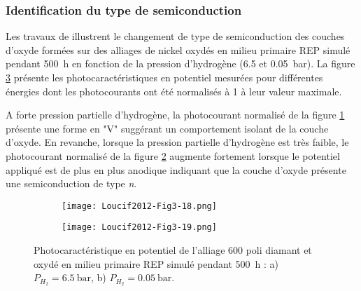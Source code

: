 \begin{refsection}
    \subsubsection{Identification du type de semiconduction}

    Les travaux de \citet{Loucif2013} illustrent le changement de type de semiconduction des couches d'oxyde formées 
    sur des alliages de nickel oxydés en
    milieu primaire REP simulé pendant 500~h en fonction de la pression d'hydrogène (6.5 et \SI{0.05}{\bar}).
    La figure \ref{fig:loucif_application} présente les photocaractéristiques en potentiel mesurées pour différentes
    énergies dont les photocourants ont été normalisés à 1 à leur valeur maximale.
    
    A forte pression partielle d'hydrogène, la photocourant normalisé de la figure
    \ref{subfig:loucif_fig3_18} présente une forme en "V" suggérant un comportement isolant de la couche d'oxyde.
    En revanche, lorsque la pression partielle d'hydrogène est très faible, le photocourant normalisé de la figure \ref{subfig:loucif_fig3_19}
    augmente fortement lorsque le potentiel appliqué est de plus en plus anodique
    indiquant que la couche d'oxyde présente une semiconduction de type \emph{n}.
    
     \begin{figure}[H]
        \centering
        \begin{subfigure}[b]{0.48\textwidth}
            \texttt{[image: Loucif2012-Fig3-18.png]}
            \caption{}
            \label{subfig:loucif_fig3_18}
        \end{subfigure}
        \begin{subfigure}[b]{0.48\textwidth}
            \texttt{[image: Loucif2012-Fig3-19.png]}
            \caption{}
            \label{subfig:loucif_fig3_19}
        \end{subfigure}
        \caption[Photocaractéristique en potentiel de l'alliage 600 poli diamant et oxydé en milieu primaire REP simulé pendant
        500~h:
        a) $P_{H_2} = \SI{6.5}{\bar}$,
        b) $P_{H_2} = \SI{0.05}{\bar}$.]
        {Photocaractéristique en potentiel de l'alliage 600 poli diamant et oxydé en milieu primaire REP simulé pendant
            500~h \citep{Loucif2013}: 
        a) $P_{H_2} = \SI{6.5}{\bar}$,
        b) $P_{H_2} = \SI{0.05}{\bar}$.}
        \label{fig:loucif_application}
    \end{figure}


\end{refsection}
